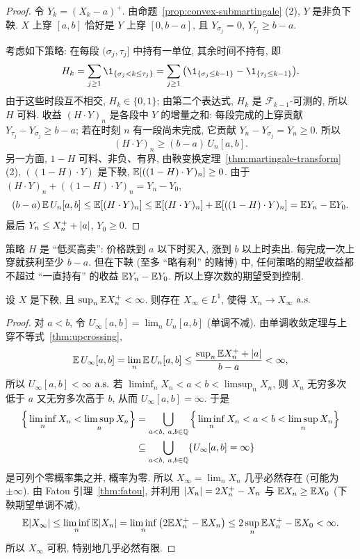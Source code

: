 \begin{proof}
令 $Y_k=(X_k-a)^+$. 由命题~\ref{prop:convex-submartingale} (2), $Y$ 是非负下鞅. $X$ 上穿 $[a,b]$ 恰好是 $Y$ 上穿 $[0,b-a]$, 且 $Y_{\sigma_j}=0$, $Y_{\tau_j}\ge b-a$.

考虑如下策略: 在每段 $(\sigma_j,\tau_j]$ 中持有一单位, 其余时间不持有, 即
\[
H_k=\sum_{j\ge1}\1_{\{\sigma_j<k\le\tau_j\}}=\sum_{j\ge1}\big(\1_{\{\sigma_j\le k-1\}}-\1_{\{\tau_j\le k-1\}}\big).
\]
由于这些时段互不相交, $H_k\in\{0,1\}$; 由第二个表达式, $H_k$ 是 $\mathcal{F}_{k-1}$-可测的, 所以 $H$ 可料. 收益 $(H\cdot Y)_n$ 是各段中 $Y$ 的增量之和: 每段完成的上穿贡献 $Y_{\tau_j}-Y_{\sigma_j}\ge b-a$; 若在时刻 $n$ 有一段尚未完成, 它贡献 $Y_n-Y_{\sigma_j}=Y_n\ge0$. 所以
\[
(H\cdot Y)_n\ge(b-a)\,U_n[a,b].
\]
另一方面, $1-H$ 可料、非负、有界, 由鞅变换定理~\ref{thm:martingale-transform} (2), $((1-H)\cdot Y)$ 是下鞅, $\mathbb{E}[((1-H)\cdot Y)_n]\ge0$. 由于 $(H\cdot Y)_n+((1-H)\cdot Y)_n=Y_n-Y_0$,
\[
(b-a)\,\mathbb{E}\,U_n[a,b]\le\mathbb{E}[(H\cdot Y)_n]\le\mathbb{E}[(H\cdot Y)_n]+\mathbb{E}[((1-H)\cdot Y)_n]=\mathbb{E} Y_n-\mathbb{E} Y_0.
\]
最后 $Y_n\le X_n^++\lvert a\rvert$, $Y_0\ge0$.
\end{proof}

\begin{intuition}
策略 $H$ 是 ``低买高卖'': 价格跌到 $a$ 以下时买入, 涨到 $b$ 以上时卖出. 每完成一次上穿就获利至少 $b-a$. 但在下鞅 (至多 ``略有利'' 的赌博) 中, 任何策略的期望收益都不超过 ``一直持有'' 的收益 $\mathbb{E} Y_n-\mathbb{E} Y_0$. 所以上穿次数的期望受到控制.
\end{intuition}

\begin{theorem}[鞅收敛定理]\label{thm:mart-conv}
设 $X$ 是下鞅, 且 $\sup_n\mathbb{E} X_n^+<\infty$. 则存在 $X_\infty\in L^1$, 使得 $X_n\to X_\infty$ $\text{a.s.}$
\end{theorem}

\begin{proof}
对 $a<b$, 令 $U_\infty[a,b]=\lim_nU_n[a,b]$ (单调不减). 由单调收敛定理与上穿不等式~\ref{thm:upcrossing},
\[
\mathbb{E}\,U_\infty[a,b]=\lim_n\mathbb{E}\,U_n[a,b]\le\frac{\sup_n\mathbb{E} X_n^++\lvert a\rvert}{b-a}<\infty,
\]
所以 $U_\infty[a,b]<\infty$ $\text{a.s.}$ 若 $\liminf_nX_n<a<b<\limsup_nX_n$, 则 $X_n$ 无穷多次低于 $a$ 又无穷多次高于 $b$, 从而 $U_\infty[a,b]=\infty$. 于是
\begin{align*}
\Big\{\liminf_nX_n<\limsup_nX_n\Big\}&=\bigcup_{a<b,\ a,b\in\Q}\Big\{\liminf_nX_n<a<b<\limsup_nX_n\Big\}\\
&\subseteq\bigcup_{a<b,\ a,b\in\Q}\{U_\infty[a,b]=\infty\}
\end{align*}
是可列个零概率集之并, 概率为零. 所以 $X_\infty=\lim_nX_n$ 几乎必然存在 (可能为 $\pm\infty$). 由 Fatou 引理~\ref{thm:fatou}, 并利用 $\lvert X_n\rvert=2X_n^+-X_n$ 与 $\mathbb{E} X_n\ge\mathbb{E} X_0$ (下鞅期望单调不减),
\[
\mathbb{E}\lvert X_\infty\rvert\le\liminf_n\mathbb{E}\lvert X_n\rvert=\liminf_n\big(2\mathbb{E} X_n^+-\mathbb{E} X_n\big)\le2\sup_n\mathbb{E} X_n^+-\mathbb{E} X_0<\infty.
\]
所以 $X_\infty$ 可积, 特别地几乎必然有限.
\end{proof}

